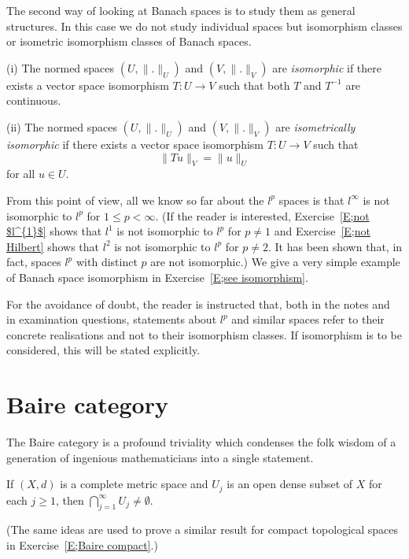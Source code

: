 The second way of looking at Banach spaces is to study
them as general structures. In this case we do not study
individual spaces but isomorphism classes or
isometric isomorphism classes of Banach spaces.
\begin{definition} (i) The normed spaces $(U,\|.\|_{U})$
and $(V,\|.\|_{V})$ are \emph{isomorphic} if there exists a
vector space isomorphism $T:U\rightarrow V$ such that
both $T$ and $T^{-1}$ are continuous.

(ii)  The normed spaces $(U,\|.\|_{U})$
and $(V,\|.\|_{V})$ are 
\emph{isometrically isomorphic} if there exists a
vector space isomorphism $T:U\rightarrow V$ such that
\[\|Tu\|_{V}=\|u\|_{U}\]
for all $u\in U$.
\end{definition}
From this point of view, all we know so far
about the $l^{p}$ spaces is that 
$l^{\infty}$ is not isomorphic to $l^{p}$ for $1\leq p<\infty$.
(If the reader is interested, Exercise~\ref{E;not $l^{1}$}
shows that $l^{1}$ is not isomorphic to $l^{p}$ for $p\neq 1$
and Exercise~\ref{E;not Hilbert}
shows that $l^{2}$ is not isomorphic to $l^{p}$ for $p\neq 2$.
It has been shown that, in fact, spaces $l^{p}$ with distinct
$p$ are not isomorphic.) We give a very simple example of Banach space
isomorphism in Exercise~\ref{E;see isomorphism}.

For the avoidance of doubt, the reader is instructed that,
both in the notes and in examination questions, statements
about $l^{p}$ and similar spaces refer to their concrete realisations
and not to their isomorphism classes. If isomorphism
is to be considered, this will be stated explicitly.
\section{Baire category} The Baire category is a profound triviality
which condenses the folk wisdom of a generation of ingenious
mathematicians into a single statement.

\begin{theorem}\label{T;Baire 1} If $(X,d)$ is a complete metric space
and $U_{j}$ is an open dense subset of $X$ for each $j\geq 1$,
then $\bigcap_{j=1}^{\infty}U_{j}\neq\emptyset$.
\end{theorem}
(The same ideas are used to prove a similar result for compact
topological spaces in Exercise~\ref{E;Baire compact}.)

